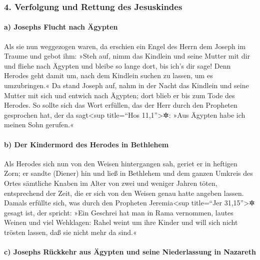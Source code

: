 \hypertarget{verfolgung-und-rettung-des-jesuskindes}{%
\subsubsection{4. Verfolgung und Rettung des
Jesuskindes}\label{verfolgung-und-rettung-des-jesuskindes}}

\hypertarget{a-josephs-flucht-nach-uxe4gypten}{%
\paragraph{a) Josephs Flucht nach
Ägypten}\label{a-josephs-flucht-nach-uxe4gypten}}

 Als sie nun weggezogen waren, da erschien ein Engel des
Herrn dem Joseph im Traume und gebot ihm: »Steh auf, nimm das Kindlein
und seine Mutter mit dir und fliehe nach Ägypten und bleibe so lange
dort, bis ich's dir sage! Denn Herodes geht damit um, nach dem Kindlein
suchen zu lassen, um es umzubringen.«  Da stand Joseph
auf, nahm in der Nacht das Kindlein und seine Mutter mit sich und
entwich nach Ägypten;  dort blieb er bis zum Tode des
Herodes. So sollte sich das Wort erfüllen, das der Herr durch den
Propheten gesprochen hat, der da sagt\textless sup title=``Hos
11,1''\textgreater✲: »Aus Ägypten habe ich meinen Sohn gerufen.«

\hypertarget{b-der-kindermord-des-herodes-in-bethlehem}{%
\paragraph{b) Der Kindermord des Herodes in
Bethlehem}\label{b-der-kindermord-des-herodes-in-bethlehem}}

 Als Herodes sich nun von den Weisen hintergangen sah,
geriet er in heftigen Zorn; er sandte (Diener) hin und ließ in Bethlehem
und dem ganzen Umkreis des Ortes sämtliche Knaben im Alter von zwei und
weniger Jahren töten, entsprechend der Zeit, die er sich von den Weisen
genau hatte angeben lassen.  Damals erfüllte sich, was
durch den Propheten Jeremia\textless sup title=``Jer
31,15''\textgreater✲ gesagt ist, der spricht:  »Ein
Geschrei hat man in Rama vernommen, lautes Weinen und viel Wehklagen:
Rahel weint um ihre Kinder und will sich nicht trösten lassen, daß sie
nicht mehr da sind.«

\hypertarget{c-josephs-ruxfcckkehr-aus-uxe4gypten-und-seine-niederlassung-in-nazareth}{%
\paragraph{c) Josephs Rückkehr aus Ägypten und seine Niederlassung in
Nazareth}\label{c-josephs-ruxfcckkehr-aus-uxe4gypten-und-seine-niederlassung-in-nazareth}}

